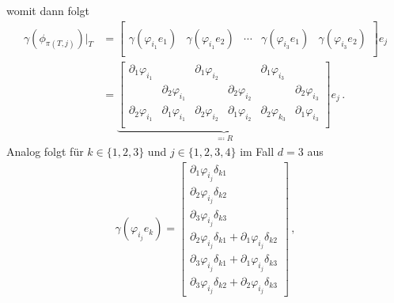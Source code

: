 \documentclass{scrartcl}
\def\ev{e}
\newcommand{\vect}[1]{\begin{bmatrix} #1 \end{bmatrix}}
\begin{document}
womit dann folgt
\begin{align*}
	\gamma\left(\phi_{\pi(T,j)}\right)\bigg\vert_T
	&= \begin{bmatrix}
		& & & & \\
		\gamma(\varphi_{i_1}e_1) & \gamma(\varphi_{i_1}e_2)
		& \cdots
		& \gamma(\varphi_{i_3}e_1) & \gamma(\varphi_{i_3}e_2) \\
		& & & &
	\end{bmatrix}e_j	 \\	
	&= \underbrace{\begin{bmatrix}
		\partial_1\varphi_{i_1} & &\partial_1\varphi_{i_2}& &\partial_1\varphi_{i_3} & \\
		& \partial_2\varphi_{i_1} & &\partial_2\varphi_{i_2}& &\partial_2\varphi_{i_3} \\
		\partial_2\varphi_{i_1} & \partial_1\varphi_{i_1} & \partial_2\varphi_{i_2} &\partial_1\varphi_{i_2}& \partial_2\varphi_{k_3} &\partial_1\varphi_{i_3} \\
	\end{bmatrix}}_{\eqqcolon R}
	\ev_j\,.
\end{align*}
Analog folgt für $k\in\{1,2,3\}$ und $j\in\{1,2,3,4\}$ im Fall $d=3$ aus
\begin{align*}
	\gamma(\varphi_{i_j}e_k)
	= \vect{ \partial_1\varphi_{i_j}\delta_{k1} \\
	\partial_2\varphi_{i_j}\delta_{k2} \\
	\partial_3\varphi_{i_j}\delta_{k3} \\
	\partial_2\varphi_{i_j}\delta_{k1}+\partial_1\varphi_{i_j}\delta_{k2}\\
	\partial_3\varphi_{i_j}\delta_{k1}+\partial_1\varphi_{i_j}\delta_{k3} \\
	\partial_3\varphi_{i_j}\delta_{k2}+\partial_2\varphi_{i_j}\delta_{k3} }\,,
\end{align*}
\end{document}
